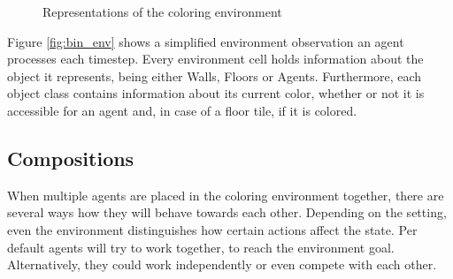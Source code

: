 \begin{figure}[hpbt]
    \centering
    \hspace{0.01\textwidth}
    \caption[Coloring Environment]{Representations of the coloring environment}
    \label{fig:multipic_env} %
\end{figure}

Figure \ref{fig:bin_env} shows a simplified environment observation an agent processes each timestep. Every environment cell holds information about the object it represents, being either Walls, Floors or Agents. Furthermore, each object class contains information about its current color, whether or not it is accessible for an agent and, in case of a floor tile, if it is colored.


\subsection{Compositions}
When multiple agents are placed in the coloring environment together, there are several ways how they will behave towards each other. Depending on the setting, even the environment distinguishes how certain actions affect the state. Per default agents will try to work together, to reach the environment goal. Alternatively, they could work independently or even compete with each other.

